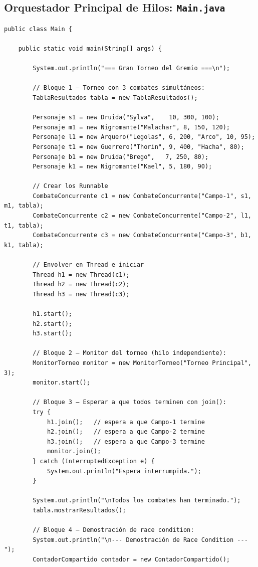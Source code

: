 \documentclass[11pt,letterpaper]{article}
\begin{document}
\subsection{Orquestador Principal de Hilos: \texttt{Main.java}}
\begin{lstlisting}[style=JavaStyle]
public class Main {

    public static void main(String[] args) {

        System.out.println("=== Gran Torneo del Gremio ===\n");

        // Bloque 1 — Torneo con 3 combates simultáneos:
        TablaResultados tabla = new TablaResultados();

        Personaje s1 = new Druida("Sylva",    10, 300, 100);
        Personaje m1 = new Nigromante("Malachar", 8, 150, 120);
        Personaje l1 = new Arquero("Legolas", 6, 200, "Arco", 10, 95);
        Personaje t1 = new Guerrero("Thorin", 9, 400, "Hacha", 80);
        Personaje b1 = new Druida("Brego",   7, 250, 80);
        Personaje k1 = new Nigromante("Kael", 5, 180, 90);

        // Crear los Runnable
        CombateConcurrente c1 = new CombateConcurrente("Campo-1", s1, m1, tabla);
        CombateConcurrente c2 = new CombateConcurrente("Campo-2", l1, t1, tabla);
        CombateConcurrente c3 = new CombateConcurrente("Campo-3", b1, k1, tabla);

        // Envolver en Thread e iniciar
        Thread h1 = new Thread(c1);
        Thread h2 = new Thread(c2);
        Thread h3 = new Thread(c3);

        h1.start();
        h2.start();
        h3.start();

        // Bloque 2 — Monitor del torneo (hilo independiente):
        MonitorTorneo monitor = new MonitorTorneo("Torneo Principal", 3);
        monitor.start();

        // Bloque 3 — Esperar a que todos terminen con join():
        try {
            h1.join();   // espera a que Campo-1 termine
            h2.join();   // espera a que Campo-2 termine
            h3.join();   // espera a que Campo-3 termine
            monitor.join();
        } catch (InterruptedException e) {
            System.out.println("Espera interrumpida.");
        }

        System.out.println("\nTodos los combates han terminado.");
        tabla.mostrarResultados();

        // Bloque 4 — Demostración de race condition:
        System.out.println("\n--- Demostración de Race Condition ---");
        ContadorCompartido contador = new ContadorCompartido();


\end{lstlisting}
\end{document}
